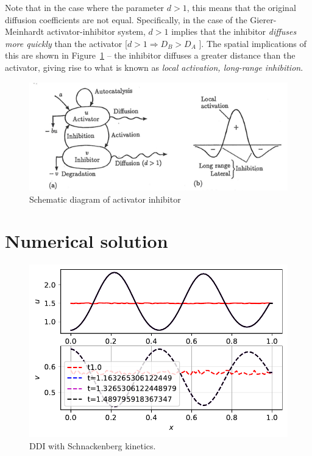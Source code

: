 \documentclass[
  letterpaper,
  DIV=11,
  numbers=noendperiod]{scrreprt}
\theoremstyle{plain}
\theoremstyle{definition}
\theoremstyle{plain}
\theoremstyle{remark}
\begin{document}
Note that in the case where the parameter \(d > 1\), this means that the
original diffusion coefficients are not equal. Specifically, in the case
of the Gierer-Meinhardt activator-inhibitor system, \(d >1\) implies
that the inhibitor \emph{diffuses more quickly} than the activator
{[}\(d > 1 \Rightarrow D_B > D_A\) {]}. The spatial implications of this
are shown in Figure~\ref{fig-ai} -- the inhibitor diffuses a greater
distance than the activator, giving rise to what is known as \emph{local
activation, long-range inhibition}.

\begin{figure}

{\centering \includegraphics{activator_inhibitor.png}

}

\caption{\label{fig-ai}Schematic diagram of activator inhibitor}

\end{figure}

\hypertarget{numerical-solution-1}{%
\section{Numerical solution}\label{numerical-solution-1}}

\begin{figure}

{\centering \includegraphics{DiffusionDrivenInstability_files/figure-pdf/fig-schnack_ddi_pde-output-1.pdf}

}

\caption{\label{fig-schnack_ddi_pde}DDI with Schnackenberg kinetics.}

\end{figure}
\end{document}
